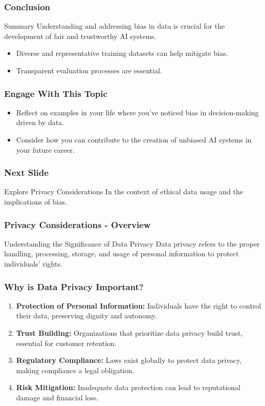 \documentclass[aspectratio=169]{beamer}
\begin{document}
\begin{frame}[fragile]
    \frametitle{Conclusion}
    \begin{block}{Summary}
        Understanding and addressing bias in data is crucial for the development of fair and trustworthy AI systems.
    \end{block}
    \begin{itemize}
        \item Diverse and representative training datasets can help mitigate bias.
        \item Transparent evaluation processes are essential.
    \end{itemize}
\end{frame}

\begin{frame}[fragile]
    \frametitle{Engage With This Topic}
    \begin{itemize}
        \item Reflect on examples in your life where you’ve noticed bias in decision-making driven by data.
        \item Consider how you can contribute to the creation of unbiased AI systems in your future career.
    \end{itemize}
\end{frame}

\begin{frame}[fragile]
    \frametitle{Next Slide}
    \begin{block}{Explore Privacy Considerations}
        In the context of ethical data usage and the implications of bias.
    \end{block}
\end{frame}

\begin{frame}[fragile]
    \frametitle{Privacy Considerations - Overview}
    \begin{block}{Understanding the Significance of Data Privacy}
        Data privacy refers to the proper handling, processing, storage, and usage of personal information to protect individuals' rights.
    \end{block}
\end{frame}

\begin{frame}[fragile]
    \frametitle{Why is Data Privacy Important?}
    \begin{enumerate}
        \item \textbf{Protection of Personal Information:} Individuals have the right to control their data, preserving dignity and autonomy.
        \item \textbf{Trust Building:} Organizations that prioritize data privacy build trust, essential for customer retention.
        \item \textbf{Regulatory Compliance:} Laws exist globally to protect data privacy, making compliance a legal obligation.
        \item \textbf{Risk Mitigation:} Inadequate data protection can lead to reputational damage and financial loss.
    \end{enumerate}
\end{frame}
\end{document}
